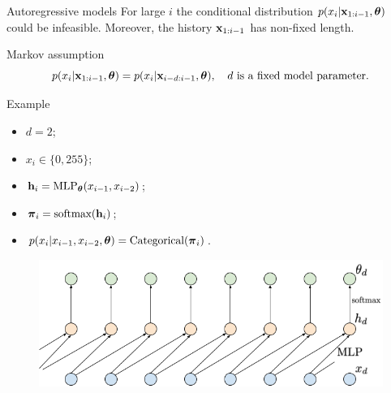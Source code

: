 \begin{frame}{Autoregressive models}
		For large $i$ the conditional distribution $p(x_i | \mathbf{x}_{1:i - 1}, \boldsymbol{\theta})$ could be infeasible. Moreover, the history $\mathbf{x}_{1:i-1}$ has non-fixed length.
		\begin{block}{Markov assumption}
			\vspace{-0.5cm}
			\[
				p(x_i | \mathbf{x}_{1:i - 1}, \boldsymbol{\theta}) = p(x_i | \mathbf{x}_{i - d:i - 1}, \boldsymbol{\theta}), \quad d \text{ is a fixed model parameter}.
			\]
		\end{block}
		\vspace{-0.5cm}
		\begin{block}{Example}
			\begin{minipage}[t]{0.39\columnwidth}
				{\small
				\begin{itemize}
					\item $d = 2$;
					\item $x_i \in \{0, 255\}$;
					\item $\mathbf{h}_i = \text{MLP}_{\boldsymbol{\theta}}(x_{i - 1}, x_{i - 2})$;
					\item $\boldsymbol{\pi}_i = \text{softmax}(\mathbf{h}_i)$;
					\item $p(x_i | x_{i - 1}, x_{i - 2}, \boldsymbol{\theta}) = \text{Categorical}(\boldsymbol{\pi}_i)$.
				\end{itemize}
				}
			\end{minipage}%
			\begin{minipage}[t]{0.61\columnwidth}
	   \begin{figure}
	       \centering
	       \includegraphics[width=1.0\linewidth]{figs/sequential_MLP}
	   \end{figure}
			\end{minipage}
		\end{block}
\end{frame}
